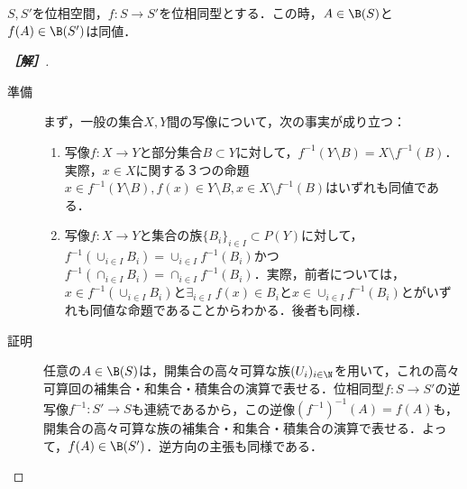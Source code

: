 \documentclass[uplatex,dvipdfmx]{jsarticle}
\begin{document}
\begin{problem*}[9]
    $S,S'$を位相空間，$f:S\to S'$を位相同型とする．この時，$A\in\B(S)$と$f(A)\in \B(S')$は同値．
\end{problem*}
\begin{proof}[\bf［解］]\mbox{}
    \begin{description}
        \item[準備] まず，一般の集合$X,Y$間の写像について，次の事実が成り立つ：
        \begin{enumerate}
            \item 写像$f:X\to Y$と部分集合$B\subset Y$に対して，$f^{-1}(Y\setminus B)=X\setminus f^{-1}(B)$．
            実際，$x\in X$に関する３つの命題$x\in f^{-1}(Y\setminus B),f(x)\in Y\setminus B,x\in X\setminus f^{-1}(B)$はいずれも同値である．
            \item 写像$f:X\to Y$と集合の族$\{B_i\}_{i\in I}\subset P(Y)$に対して，$f^{-1}(\cup_{i\in I}B_i)=\cup_{i\in I}f^{-1}(B_i)$かつ$f^{-1}(\cap_{i\in I}B_i)=\cap_{i\in I}f^{-1}(B_i)$．実際，前者については，
            $x\in f^{-1}(\cup_{i\in I}B_i)$と$\exists_{i\in I}\;f(x)\in B_i$と$x\in \cup_{i\in I}f^{-1}(B_i)$とがいずれも同値な命題であることからわかる．後者も同様．
        \end{enumerate}
        \item[証明] 任意の$A\in\B(S)$は，開集合の高々可算な族$(U_i)_{i\in\N}$を用いて，これの高々可算回の補集合・和集合・積集合の演算で表せる．位相同型$f:S\to S'$の逆写像$f^{-1}:S'\to S$も連続であるから，この逆像$(f^{-1})^{-1}(A)=f(A)$も，開集合の高々可算な族の補集合・和集合・積集合の演算で表せる．よって，$f(A)\in\B(S')$．逆方向の主張も同様である．
    \end{description}
\end{proof}
\end{document}
